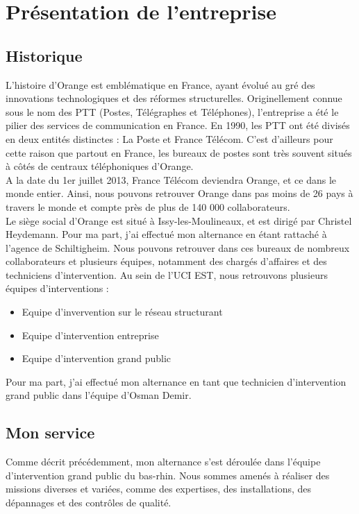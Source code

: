 \documentclass[12pt, a4paper]{article}
\begin{document}
\newpage
\section{Présentation de l'entreprise}
\subsection{Historique}
L'histoire d'Orange est emblématique en France, ayant évolué au gré des
innovations technologiques et des réformes structurelles. Originellement connue
sous le nom des PTT (Postes, Télégraphes et Téléphones), 
l'entreprise a été le pilier des services de communication en
France. En 1990, les PTT ont été divisés en deux entités distinctes : La Poste et France Télécom.
C'est d'ailleurs pour cette raison que partout en France, les bureaux de postes 
sont très souvent situés à côtés de centraux téléphoniques d'Orange.\\

A la date du 1er juillet 2013, France Télécom deviendra Orange, et ce dans le monde entier.
Ainsi, nous pouvons retrouver Orange dans pas moins de 26 pays à travers le monde et 
compte près de plus de 140 000 collaborateurs.\\

Le siège social d'Orange est situé à Issy-les-Moulineaux,
et est dirigé par Christel Heydemann. Pour ma part, 
j'ai effectué mon alternance en étant rattaché 
à l'agence de Schiltigheim. Nous pouvons retrouver 
dans ces bureaux de nombreux collaborateurs et 
plusieurs équipes, notamment des chargés d'affaires
et des techniciens d'intervention. Au sein de l'UCI EST,
nous retrouvons plusieurs équipes d'interventions :\\

\begin{itemize}
	\item Equipe d'invervention sur le réseau structurant 
	\item Equipe d'intervention entreprise
	\item Equipe d'intervention grand public\\
\end{itemize}

Pour ma part, j'ai effectué mon alternance en tant que
technicien d'intervention grand public dans l'équipe
d'Osman Demir. 


\subsection{Mon service}
Comme décrit précédemment, mon alternance s'est déroulée
dans l'équipe d'intervention grand public 
du bas-rhin. Nous sommes amenés à réaliser des missions diverses et 
variées, comme des 
expertises, des installations, des dépannages et 
des contrôles de qualité.\\
\end{document}
